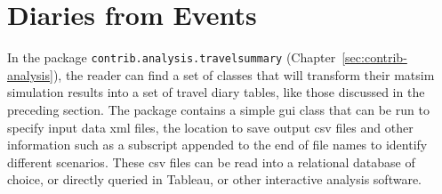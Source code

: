 \section{Diaries from Events}
In the package \lstinline|contrib.analysis.travelsummary| (Chapter~\ref{sec:contrib-analysis}), the reader can find a set of classes that will transform their \gls{matsim} simulation results into a set of travel diary tables, like those discussed in the preceding section. The package contains a simple \gls{gui} class that can be run to specify input data \gls{xml} files, the location to save output \gls{csv} files and other information such as a subscript appended to the end of file names to identify different scenarios. These \gls{csv} files can be read into a relational database of choice, or directly queried in Tableau, or other interactive analysis software.





